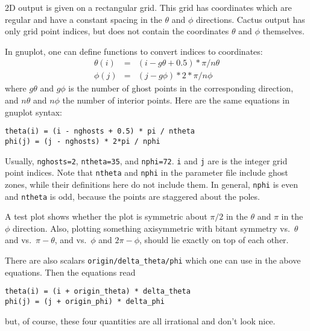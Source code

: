 2D output is given on a rectangular grid.  This grid has coordinates
which are regular and have a constant spacing in the $\theta$ and
$\phi$ directions.  Cactus output has only grid point indices, but
does not contain the coordinates $\theta$ and $\phi$ themselves.

In gnuplot, one can define functions to convert indices to
coordinates:
\begin{eqnarray}
  \theta(i) & = & (i - g\theta + 0.5) * \pi   / n\theta
  \\
  \phi(j)   & = & (j - g\phi        ) * 2*\pi / n\phi
\end{eqnarray}
where $g\theta$ and $g\phi$ is the number of ghost points in the
corresponding direction, and $n\theta$ and $n\phi$ the number of
interior points.  Here are the same equations in gnuplot syntax:
\begin{verbatim}
theta(i) = (i - nghosts + 0.5) * pi / ntheta
phi(j) = (j - nghosts) * 2*pi / nphi
\end{verbatim}

Usually, \verb|nghosts=2|, \verb|ntheta=35|, and \verb|nphi=72|.
\verb|i| and \verb|j| are is the integer grid point indices.  Note
that \verb|ntheta| and \verb|nphi| in the parameter file include ghost
zones, while their definitions here do not include them.  In general,
\verb|nphi| is even and \verb|ntheta| is odd, because the points are
staggered about the poles.

A test plot shows whether the plot is symmetric about $\pi/2$ in the
$\theta$ and $\pi$ in the $\phi$ direction.  Also, plotting something
axisymmetric with bitant symmetry vs.\ $\theta$ and vs.\ $\pi-\theta$,
and vs.\ $\phi$ and $2\pi-\phi$, should lie exactly on top of each
other.

There are also scalars \verb|origin/delta_theta/phi| which one can use
in the above equations.  Then the equations read
\begin{verbatim}
theta(i) = (i + origin_theta) * delta_theta
phi(j) = (j + origin_phi) * delta_phi
\end{verbatim}
but, of course, these four quantities are all irrational and don't
look nice.



\begin{thebibliography}{9}

\end{thebibliography}




